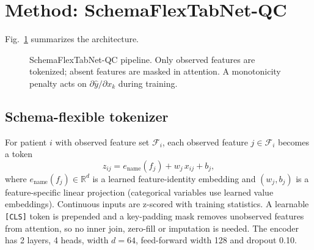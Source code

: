 \documentclass[journal]{IEEEtran}
\newcommand{\sfn}{SchemaFlexTabNet-QC}
\begin{document}
\section{Method: \sfn{}}\label{sec:method}
Fig.~\ref{fig:arch} summarizes the architecture.

\begin{figure}[t]
\centering
{}
\caption{\sfn{} pipeline. Only observed features are tokenized; absent features are masked in attention. A monotonicity penalty acts on $\partial\hat y/\partial x_k$ during training.}
\label{fig:arch}
\end{figure}

\subsection{Schema-flexible tokenizer}
For patient $i$ with observed feature set $\mathcal{F}_i$, each observed feature $j\in\mathcal{F}_i$ becomes a token
\begin{equation}
z_{ij}=e_{\mathrm{name}}(f_j)+w_j\,x_{ij}+b_j,
\end{equation}
where $e_{\mathrm{name}}(f_j)\in\mathbb{R}^d$ is a learned feature-identity embedding and $(w_j,b_j)$ is a feature-specific linear projection (categorical variables use learned value embeddings). Continuous inputs are z-scored with training statistics. A learnable \texttt{[CLS]} token is prepended and a key-padding mask removes unobserved features from attention, so no inner join, zero-fill or imputation is needed. The encoder has 2 layers, 4 heads, width $d=64$, feed-forward width 128 and dropout 0.10.
\end{document}
